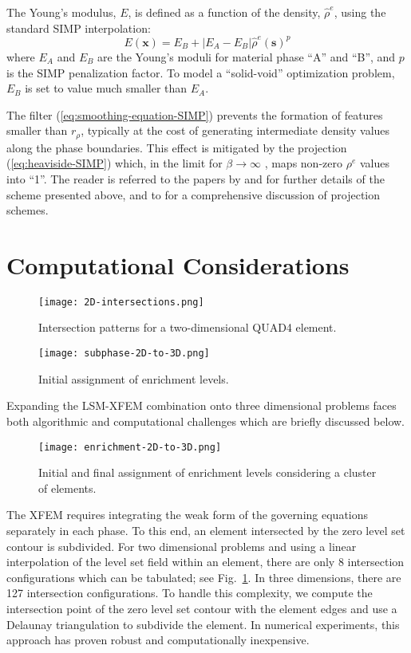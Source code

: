 The Young's modulus, $E$, is defined as a function of the density, $\hat{\rho}^{e}$, using the standard SIMP interpolation:
%
\begin{equation}
\label{eq:SIMP-elastic-modulus-two-phase}
	E(\mathbf{x}) = E_{B} + \lvert E_{A} - E_{B} \rvert \hat{\rho}^{e}(\mathbf{s})^{p}
\end{equation}
%
where $E_{A}$ and $E_{B}$ are the Young's moduli for material phase ``A'' and ``B'', and $p$ is the SIMP penalization factor. To model a ``solid-void'' optimization problem, $E_B$ is set to value much smaller than $E_A$.

The filter (\ref{eq:smoothing-equation-SIMP}) prevents the formation of features smaller than $r_{\rho}$, typically at the cost of generating intermediate density values along the phase boundaries. This effect is mitigated by the projection (\ref{eq:heaviside-SIMP}) which, in the limit for $\beta \rightarrow \infty$ , maps non-zero $\rho^e$ values into ``1''. The reader is referred to the papers by \citet{GPB:04} and \citet{GAH:11} for further details of the scheme presented above, and to \citet{SM:13} for a comprehensive discussion of projection schemes.


\section{Computational Considerations}
\label{sec:computational-considerations}
%
\begin{figure}
	\centering
	\texttt{[image: 2D-intersections.png]}
	\caption{Intersection patterns for a two-dimensional QUAD4 element.}
	\label{fig:2D-intersections}
\end{figure}
%
\begin{figure}[hb!]
	\centering
	\texttt{[image: subphase-2D-to-3D.png]}
	\caption{Initial assignment of enrichment levels.}
	\label{fig:subphase-2D-to-3D}
\end{figure}
%
Expanding the LSM-XFEM combination onto three dimensional problems faces both algorithmic and computational challenges which are briefly discussed below.
%
\begin{figure*}[t]
	\texttt{[image: enrichment-2D-to-3D.png]}
	\caption{Initial and final assignment of enrichment levels considering a cluster of elements.}
	\label{fig:enrichment-2D-to-3D}
\end{figure*}
%
The XFEM requires integrating the weak form of the governing equations separately in each phase. To this end, an element intersected by the zero level set contour is subdivided. For two dimensional problems and using a linear interpolation of the level set field within an element, there are only 8 intersection configurations which can be tabulated; see Fig.~\ref{fig:2D-intersections}. In three dimensions, there are 127 intersection configurations. To handle this complexity, we compute the intersection point of the zero level set contour with the element edges and use a Delaunay triangulation to subdivide the element. In numerical experiments, this approach has proven robust and computationally inexpensive.

